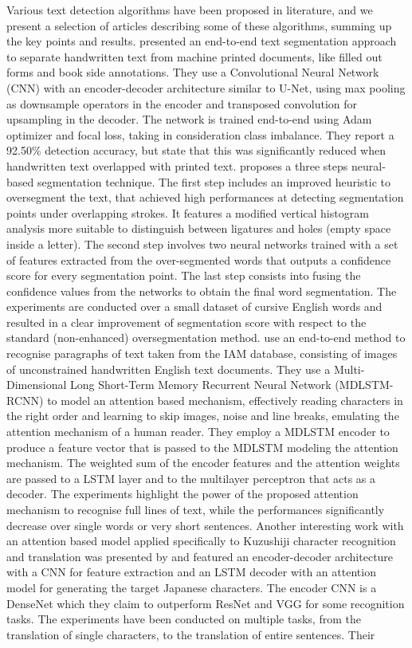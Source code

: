 Various text detection algorithms have  been proposed in literature, and we present a selection of articles describing some of these algorithms, summing up the key points and results. \citeauthor{Jo2019-qb}\cite{Jo2019-qb} presented an end-to-end text segmentation approach to separate handwritten text from machine printed documents, like filled out forms and book side annotations. They use a Convolutional Neural Network (CNN) with an encoder-decoder architecture similar to U-Net, using max pooling as downsample operators in the encoder and transposed convolution for upsampling in the decoder. The network is trained end-to-end using Adam optimizer and focal loss, taking in consideration class imbalance. They report a 92.50\% detection accuracy, but state that this was significantly reduced when handwritten text overlapped with printed text. \citeauthor{Blumenstein2008-we}\cite{Blumenstein2008-we} proposes a three steps neural-based segmentation technique. The first step includes an improved heuristic to oversegment the text, that achieved high performances at detecting segmentation points under overlapping strokes. It features a modified vertical histogram analysis more suitable to distinguish between ligatures and holes (empty space inside a letter). The second step involves two neural networks trained with a set of features extracted from the over-segmented words that outputs a confidence score for every segmentation point. The last step consists into fusing the confidence values from the networks to obtain the final word segmentation. The experiments are conducted over a small dataset of cursive English words and resulted in a clear improvement of segmentation score with respect to the standard (non-enhanced) oversegmentation method. \citeauthor{Bluche2016-pt}\cite{Bluche2016-pt} use an end-to-end method to recognise paragraphs of text taken from the IAM database, consisting of images of unconstrained handwritten English text documents. They use a Multi-Dimensional Long Short-Term Memory Recurrent Neural Network (MDLSTM-RCNN) to model an attention based mechanism, effectively reading characters in the right order and learning to skip images, noise and line breaks, emulating the attention mechanism of a human reader. They employ a MDLSTM encoder to produce a feature vector that is passed to the MDLSTM modeling the attention mechanism. The weighted sum of the encoder features and the attention weights are passed to a LSTM layer and to the multilayer perceptron that acts as a decoder. The experiments highlight the power of the proposed attention mechanism to recognise full lines of text, while the performances significantly decrease over single words or very short sentences. Another interesting work with an attention based model applied specifically to Kuzushiji character recognition and translation was presented by \citeauthor{Clanuwat2018-vm}\cite{Clanuwat2018-vm} and featured an encoder-decoder architecture with a CNN for feature extraction and an LSTM decoder with an attention model for generating the target Japanese characters. The encoder CNN is a DenseNet which they claim to outperform ResNet and VGG for some recognition tasks. The experiments have been conducted on multiple tasks, from the translation of single characters, to the translation of entire sentences. Their 